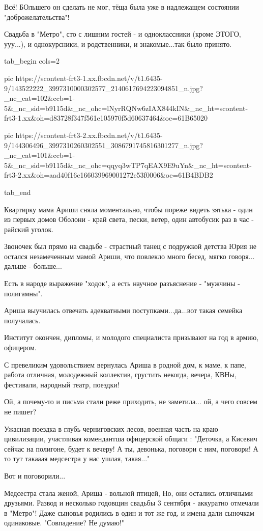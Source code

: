 Всё! БОльшего он сделать не мог, тёща была уже в надлежащем состоянии
"доброжелательства"!

Свадьба в "Метро", сто с лишним гостей - и одноклассники (кроме ЭТОГО, ууу...),
и однокурсники, и родственники, и знакомые...так было принято.

\ifcmt
  tab_begin cols=2

     pic https://scontent-frt3-1.xx.fbcdn.net/v/t1.6435-9/143522222_3997310000302577_2140617694223094851_n.jpg?_nc_cat=102&ccb=1-5&_nc_sid=b9115d&_nc_ohc=lNyrRQNw6zIAX844kIN&_nc_ht=scontent-frt3-1.xx&oh=d83728f347f561e105970f5d60637464&oe=61B65020

     pic https://scontent-frt3-2.xx.fbcdn.net/v/t1.6435-9/144306496_3997310260302551_3086791745816301277_n.jpg?_nc_cat=101&ccb=1-5&_nc_sid=b9115d&_nc_ohc=qqyq3wTP7qEAX9E9uYn&_nc_ht=scontent-frt3-2.xx&oh=aad40f16c166039969001272e53f0006&oe=61B4BDB2

  tab_end
\fi

Квартирку мама Ариши сняла моментально, чтобы пореже видеть зятька - один из
первых домов Оболони - край света, пески, ветер, один автобусик раз в час -
райский уголок.

Звоночек был прямо на свадьбе - страстный танец с подружкой детства Юрия не
остался незамеченным мамой Ариши, что повлекло много бесед, мягко говоря...
дальше - больше...

Есть в народе выражение "ходок", а есть научное разъяснение - "мужчины -
полигамны".

Ариша выучилась отвечать адекватными поступками...да...вот такая семейка
получалась.

Институт окончен, дипломы, и молодого специалиста призывают на год в армию,
офицером.

С превеликим удовольствием вернулась Ариша в родной дом, к маме, к папе, работа
отличная, молодежный коллектив, грустить некогда, вечера, КВНы, фестивали,
народный театр, поездки!

Ой, а почему-то и письма стали реже приходить, не заметила... ой, а чего совсем
не пишет?

Ужасная поездка в глубь черниговских лесов, военная часть на краю цивилизации,
участливая комендантша офицерской общаги : "Деточка, а Кисевич сейчас на
полигоне, будет к вечеру! А ты, девонька, поговори с ним, поговори! А то тут
такааая медсестра у нас ушлая, такая..."

Вот и поговорили...

Медсестра стала женой, Ариша - вольной птицей, Но, они остались отличными
друзьями. Развод и несколько годовщин свадьбы 3 сентября - аккуратно отмечали в
"Метро"! Даже сыновья родились в один и тот же год, и имена дали сыночкам
одинаковые.  "Совпадение? Не думаю!"


